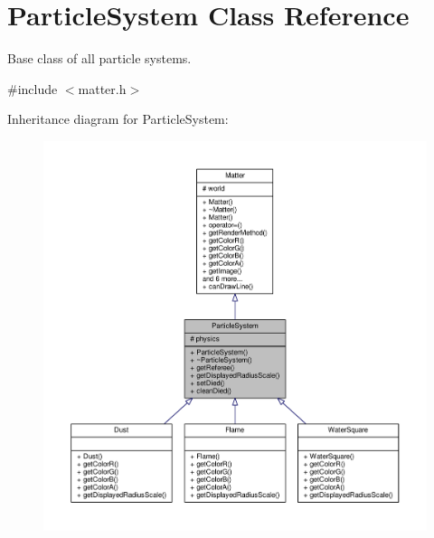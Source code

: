 \hypertarget{classParticleSystem}{}\section{Particle\+System Class Reference}
\label{classParticleSystem}


Base class of all particle systems.  




{\ttfamily \#include $<$matter.\+h$>$}



Inheritance diagram for Particle\+System\+:\nopagebreak
\begin{figure}[H]
\begin{center}
\leavevmode
\includegraphics[width=350pt]{classParticleSystem__inherit__graph}
\end{center}
\end{figure}


